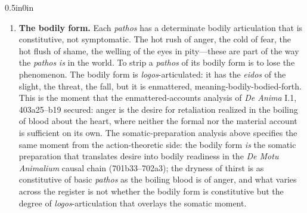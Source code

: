 \documentclass{article}
\begin{document}
\begin{adjustwidth}{0.5in}{0in}
\begin{enumerate}
        \item \textbf{The bodily form.} Each \textit{pathos} has a determinate bodily articulation that is constitutive, not symptomatic. The hot rush of anger, the cold of fear, the hot flush of shame, the welling of the eyes in pity---these are part of the way the \textit{pathos} \textit{is} in the world. To strip a \textit{pathos} of its bodily form is to lose the phenomenon. The bodily form is \textit{logos}-articulated: it has the \textit{eidos} of the slight, the threat, the fall, but it is enmattered, meaning-bodily-bodied-forth. This is the moment that the enmattered-accounts analysis of \textit{De Anima} I.1, 403a25--b19 secured: anger is the desire for retaliation realized in the boiling of blood about the heart, where neither the formal nor the material account is sufficient on its own. The somatic-preparation analysis above specifies the same moment from the action-theoretic side: the bodily form \textit{is} the somatic preparation that translates desire into bodily readiness in the \textit{De Motu Animalium} causal chain (701b33--702a3); the dryness of thirst is as constitutive of basic \textit{pathos} as the boiling blood is of anger, and what varies across the register is not whether the bodily form is constitutive but the degree of \textit{logos}-articulation that overlays the somatic moment.
        

\end{enumerate}
\end{adjustwidth}
\end{document}
